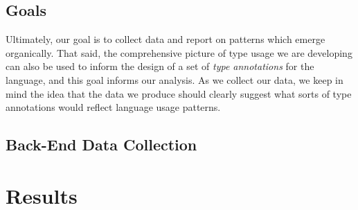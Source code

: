 \documentclass[acmsmall,10pt,review,anonymous]{acmart}\settopmatter{printfolios=true,printccs=false,printacmref=false}
\begin{document}

%
%
%
%
\subsection{Goals}

Ultimately, our goal is to collect data and report on patterns which emerge organically.
That said, the comprehensive picture of type usage we are developing can also be used to inform the design of a set of \textit{type annotations} for the language, and this goal informs our analysis.
As we collect our data, we keep in mind the idea that the data we produce should clearly suggest what sorts of type annotations would reflect language usage patterns.





%
%
%
%
\subsection{Back-End Data Collection}


%
%
%
%
%
%
\section{Results}
\end{document}
